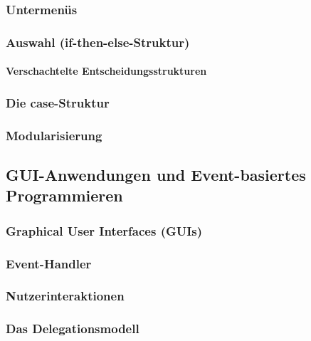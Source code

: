 \documentclass[a4paper, 11pt, accentcolor = tud3b]{tudreport}
\begin{document}
				\subsubsection{Untermenüs} %

				\subsubsection{Auswahl (if-then-else-Struktur)} %

					\paragraph{Verschachtelte Entscheidungsstrukturen} %

				\subsubsection{Die case-Struktur} %

				\subsubsection{Modularisierung} %

			\subsection{GUI-Anwendungen und Event-basiertes Programmieren} %

				\subsubsection{Graphical User Interfaces (GUIs)} %

				\subsubsection{Event-Handler} %

				\subsubsection{Nutzerinteraktionen} %

				\subsubsection{Das Delegationsmodell} %
\end{document}

